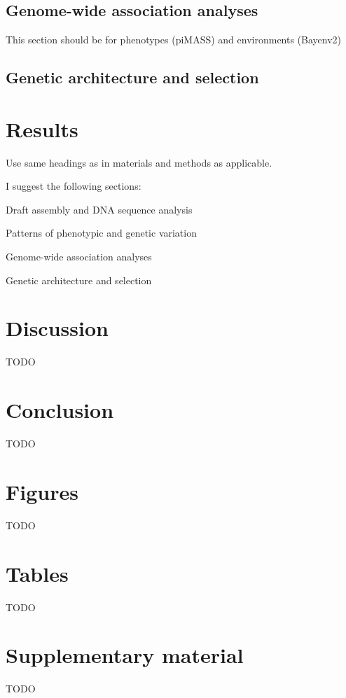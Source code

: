 \documentclass[fleqn,11pt]{wlpeerj}
\begin{document}
\subsection*{Genome-wide association analyses}
This section should be for phenotypes (piMASS) and environments (Bayenv2)

\subsection*{Genetic architecture and selection}

\section*{Results}
Use same headings as in materials and methods as applicable.

I suggest the following sections:

Draft assembly and DNA sequence analysis

Patterns of phenotypic and genetic variation

Genome-wide association analyses

Genetic architecture and selection


\section*{Discussion}
TODO


\section*{Conclusion}
TODO


\section*{Figures}
TODO

\section*{Tables}
TODO

\section*{Supplementary material}
TODO

\clearpage

\end{document}
